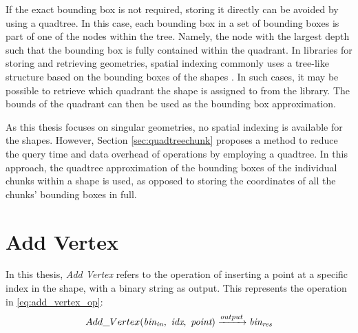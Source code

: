 \label{sec:quadtreeapproximation}
If the exact bounding box is not required, storing it directly can be avoided by using a quadtree. In this case, each bounding box in a set of bounding boxes is part of one of the nodes within the tree. Namely, the node with the largest depth such that the bounding box is fully contained within the quadrant. In libraries for storing and retrieving geometries, spatial indexing commonly uses a tree-like structure based on the bounding boxes of the shapes \cite{spatialindexing}. In such cases, it may be possible to retrieve which quadrant the shape is assigned to from the library. The bounds of the quadrant can then be used as the bounding box approximation.

As this thesis focuses on singular geometries, no spatial indexing is available for the shapes. However, Section \ref{sec:quadtreechunk} proposes a method to reduce the query time and data overhead of operations by employing a quadtree. In this approach, the quadtree approximation of the bounding boxes of the individual chunks within a shape is used, as opposed to storing the coordinates of all the chunks' bounding boxes in full.


\section{Add Vertex}
In this thesis, \emph{Add Vertex} refers to the operation of inserting a point at a specific index in the shape, with a binary string as output. This represents the operation in \ref{eq:add_vertex_op}:
\begin{equation}
    Add\_Vertex(\emph{bin}_{\emph{in}},\ \emph{idx},\ \emph{point}) \xrightarrow{output} \emph{bin}_{\emph{res}} 
    \label{eq:add_vertex_op}
\end{equation}

